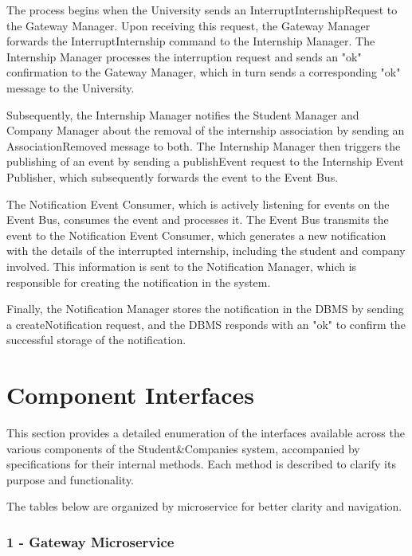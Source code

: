 The process begins when the University sends an InterruptInternshipRequest to the Gateway Manager. Upon receiving this request, the Gateway Manager forwards the InterruptInternship command to the Internship Manager. The Internship Manager processes the interruption request and sends an "ok" confirmation to the Gateway Manager, which in turn sends a corresponding "ok" message to the University.

Subsequently, the Internship Manager notifies the Student Manager and Company Manager about the removal of the internship association by sending an AssociationRemoved message to both. The Internship Manager then triggers the publishing of an event by sending a publishEvent request to the Internship Event Publisher, which subsequently forwards the event to the Event Bus.

The Notification Event Consumer, which is actively listening for events on the Event Bus, consumes the event and processes it. The Event Bus transmits the event to the Notification Event Consumer, which generates a new notification with the details of the interrupted internship, including the student and company involved. This information is sent to the Notification Manager, which is responsible for creating the notification in the system.

Finally, the Notification Manager stores the notification in the DBMS by sending a createNotification request, and the DBMS responds with an "ok" to confirm the successful storage of the notification.

\section{Component Interfaces}

This section provides a detailed enumeration of the interfaces available across the various components of the Student\&Companies system, accompanied by specifications for their internal methods. Each method is described to clarify its purpose and functionality. 

The tables below are organized by microservice for better clarity and navigation.

\subsubsection{1 - Gateway Microservice}

